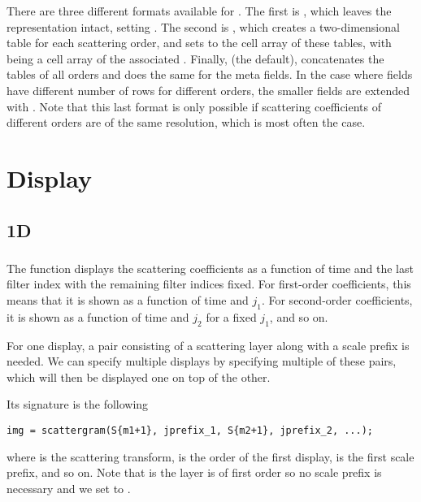 \documentclass{article}
\begin{document}
There are three different formats available for . The first is , which leaves the representation intact, setting . The second is , which creates
 a two-dimensional table for each scattering order, and sets  to the cell array of these tables, with  being a cell array of the associated . Finally,  (the default), concatenates the tables of all orders and does the same for the meta fields. In the case where  fields have different number of rows for different orders, the smaller fields are extended with . Note that this last format is only possible if scattering coefficients of different orders are of the same resolution, which is most often the case.

\section{Display \label{sec:display}}

\subsection{1D}

\subsubsection{}

The  function displays the scattering coefficients as a function of time and the last filter index with the remaining filter indices fixed. For first-order coefficients, this means that it is shown as a function of time and $j_1$. For second-order coefficients, it is shown as a function of time and $j_2$ for a fixed $j_1$, and so on.

For one display, a pair consisting of a scattering layer along with a scale prefix is needed. We can specify multiple displays by specifying multiple of these pairs, which will then be displayed one on top of the other.

Its signature is the following
\begin{lstlisting}
img = scattergram(S{m1+1}, jprefix_1, S{m2+1}, jprefix_2, ...);
\end{lstlisting}
where  is the scattering transform,  is the order of the first display,  is the first scale prefix, and so on. Note that is  the layer is of first order so no scale prefix is necessary and we set  to \mcode{[]}.
\end{document}
